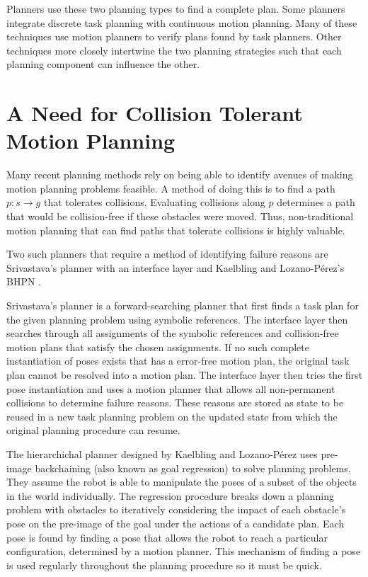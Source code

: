 Planners use these two planning types to find a complete plan. Some planners integrate discrete task planning with continuous motion planning. Many of these techniques use motion planners to verify plans found by task planners. Other techniques more closely intertwine the two planning strategies such that each planning component can influence the other. 

\section{A Need for Collision Tolerant Motion Planning} \label{intro:collisiontolerant}
Many recent planning methods rely on being able to identify avenues of making motion planning problems feasible. A method of doing this is to find a path $p:s \rightarrow g$ that tolerates collisions. Evaluating collisions along $p$ determines a path that would be collision-free if these obstacles were moved. Thus, non-traditional motion planning that can find paths that tolerate collisions is highly valuable. 

Two such planners that require a method of identifying failure reasons are Srivastava's planner with an interface layer and Kaelbling and Lozano-P\'{e}rez's BHPN \cite{srivastava:interface} \cite{kaelbling_tlp:preimage}. 

Srivastava's planner is a forward-searching planner that first finds a task plan for the given planning problem using symbolic references. The interface layer then searches through all assignments of the symbolic references and collision-free motion plans that satisfy the chosen assignments. If no such complete instantiation of poses exists that has a error-free motion plan, the original task plan cannot be resolved into a motion plan. The interface layer then tries the first pose instantiation and uses a motion planner that allows all non-permanent collisions to determine failure reasons. These reasons are stored as state to be reused in a new task planning problem on the updated state from which the original planning procedure can resume. 

The hierarchichal planner designed by Kaelbling and Lozano-P\'{e}rez uses pre-image backchaining (also known as goal regression) to solve planning problems. They assume the robot is able to manipulate the poses of a subset of the objects in the world individually. The regression procedure breaks down a planning problem with obstacles to iteratively considering the impact of each obstacle's pose on the pre-image of the goal under the actions of a candidate plan. Each pose is found by finding a pose that allows the robot to reach a particular configuration, determined by a motion planner. This mechanism of finding a pose is used regularly throughout the planning procedure so it must be quick.

